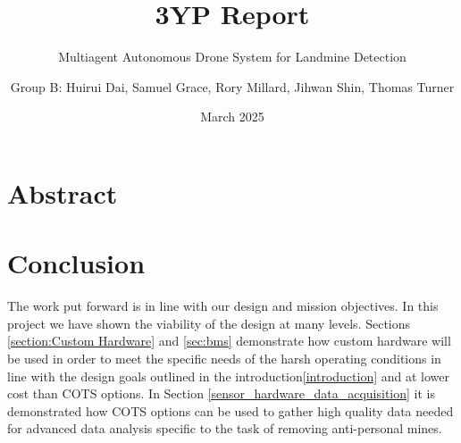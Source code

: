 \documentclass{report_template_oxford}
\title{3YP Report}
\subtitle{Multiagent Autonomous Drone System for Landmine Detection}
\author{Group B: Huirui Dai, Samuel Grace, Rory Millard, Jihwan Shin, Thomas Turner}
\date{March 2025}
\begin{document}
\maketitle




\newpage
{}
\section*{Abstract}


\newpage
\fancyhead[C]{}
\tableofcontents

\newpage
{}
\listoffigures

\newpage
{}
\listoftables

\newpage
{}
\printglossaries

\newpage
{}

























\section{Conclusion} \label{conclusion}
The work put forward is in line with our design and mission objectives. In this project we have shown the viability of the design at many levels. Sections \ref{section:Custom Hardware} and \ref{sec:bms} demonstrate how custom hardware will be used in order to meet the specific needs of the harsh operating conditions in line with the design goals outlined in the introduction\ref{introduction} and at lower cost than \gls{COTS} options. In Section \ref{sensor_hardware_data_acquisition} it is demonstrated how \gls{COTS} options can be used to gather high quality data needed for advanced data analysis specific to the task of removing anti-personal mines.
\end{document}

